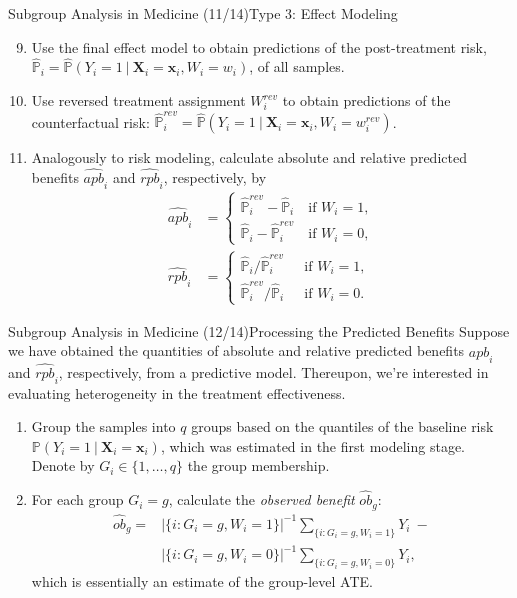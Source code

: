 \documentclass[11pt]{beamer}
\begin{document}
\begin{frame}{Subgroup Analysis in Medicine (11/14)}{Type 3: Effect Modeling}
\begin{enumerate}
\setcounter{enumi}{8}
\item Use the final effect model to obtain predictions of the post-treatment risk, $\hat{\mathbb{P}}_i = \hat{\mathbb{P}}(Y_i=1\ |\ \mathbf{X}_i = \mathbf{x}_i, W_i = w_i)$, of all samples. 
\item Use reversed treatment assignment $W_i^{rev}$ to obtain predictions of the counterfactual risk: $\hat{\mathbb{P}}_i^{rev} = \hat{\mathbb{P}}(Y_i=1\ |\ \mathbf{X}_i = \mathbf{x}_i, W_i = w_i^{rev})$.
\item Analogously to risk modeling, calculate absolute and relative predicted benefits $\widehat{apb}_i$ and $\widehat{rpb}_i$, respectively, by 
\begin{align*}
	\widehat{apb}_i &= 
	\begin{cases}
	\hat{\mathbb{P}}_i^{rev} - \hat{\mathbb{P}}_i \quad \text{if } W_i = 1, \\
	\hat{\mathbb{P}}_i - \hat{\mathbb{P}}_i^{rev} \quad \text{if } W_i = 0,
	\end{cases}
	\\
	\widehat{rpb}_i &= 
	\begin{cases}
	\hat{\mathbb{P}}_i / \hat{\mathbb{P}}_i^{rev} \quad \ \ \text{if } W_i = 1,\\
	\hat{\mathbb{P}}_i^{rev} / \hat{\mathbb{P}}_i \quad \ \ \text{if } W_i = 0.
	\end{cases}	
\end{align*}
\end{enumerate}
\end{frame}


\begin{frame}{Subgroup Analysis in Medicine (12/14)}{Processing the Predicted Benefits}
Suppose we have obtained the quantities of absolute and relative predicted benefits $\widehat{apb}_i$ and $\widehat{rpb}_i$, respectively, from a predictive model. Thereupon, we're interested in evaluating heterogeneity in the treatment effectiveness.
\begin{enumerate}
\item Group the samples into $q$ groups based on the quantiles of the baseline risk $\mathbb{P}(Y_i=1\ |\  \mathbf{X}_i = \mathbf{x}_i)$, which was estimated in the first modeling stage. Denote by $G_i \in \{ 1,\dots, q\}$ the group membership.
\item For each group $G_i = g$, calculate the \textit{observed benefit} $\widehat{ob}_g$: 
\begin{align*}
	\widehat{ob}_g = 
	&|\{i : G_i=g, W_i=1 \}|^{-1}
	\sum_{\{i : G_i=g, W_i=1 \}} Y_i
	\ -\\
	&|\{i : G_i=g, W_i=0 \}|^{-1}
	\sum_{\{i : G_i=g, W_i=0 \}} Y_i,
\end{align*}
which is essentially an estimate of the group-level ATE.
\end{enumerate}
\end{frame}
\end{document}
